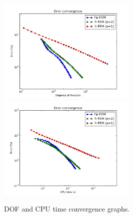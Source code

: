 \begin{figure}[!ht]
\centering
\includegraphics[height=5cm]{nist/nist-11/conv_dof_aniso.png}\ \
\includegraphics[height=5cm]{nist/nist-11/conv_cpu_aniso.png}
\caption{DOF and CPU time convergence graphs.}
\label{fig:nist-11-conv}
\end{figure}

